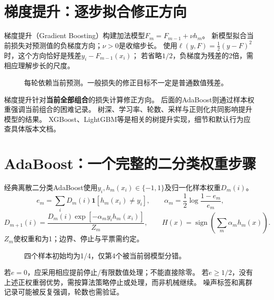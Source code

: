 \section{梯度提升：逐步拟合修正方向}
\label{sec:tree-gradient-boosting}
梯度提升（Gradient Boosting）构建加法模型$F_m=F_{m-1}+\nu h_m$。
新模型拟合当前损失对预测值的负梯度方向；$\nu>0$是收缩步长。
使用$\ell(y,F)=\frac12(y-F)^2$时，这个方向恰好是残差$y_i-F_{m-1}(x_i)$；
若省略$1/2$，负梯度为残差的2倍，需相应理解步长的尺度。

\begin{figure}[htbp]
\centering
\caption{每轮依赖当前预测。一般损失的修正目标不一定是普通数值残差。}
\par\smallskip
{}
\end{figure}

梯度提升针对\textbf{当前全部组合}的损失计算修正方向。
后面的AdaBoost则通过样本权重强调当前组合的困难记录。
树深、学习率、轮数、采样与正则化共同影响提升模型的结果。
XGBoost、LightGBM等是相关的树提升实现，细节和默认行为应查具体版本文档。


\section{AdaBoost：一个完整的二分类权重步骤}
\label{sec:tree-adaboost}
经典离散二分类AdaBoost使用$y_i,h_m(x_i)\in\{-1,1\}$及归一化样本权重$D_m(i)$。
\[
 e_m=\sum_iD_m(i)\mathbf1[h_m(x_i)\ne y_i],\qquad
 \alpha_m=\frac12\log\frac{1-e_m}{e_m},
\]
\[
 D_{m+1}(i)=\frac{D_m(i)\exp[-\alpha_my_ih_m(x_i)]}{Z_m},\qquad
 H(x)=\operatorname{sign}\!\left(\sum_m\alpha_mh_m(x)\right).
\]
$Z_m$使权重和为1；边界、停止与平票需约定。

\begin{figure}[htbp]
\centering
\caption{四个样本初始均为1/4，仅第4个被当前弱模型分错。}
\par\smallskip
{}
\end{figure}

若$e=0$，应采用相应提前停止/有限数值处理；不能直接除零。
若$e\geq1/2$，没有上述正权重弱优势，需按算法策略停止或处理，而非机械继续。
噪声标签和离群记录可能被反复强调，轮数也需验证。

